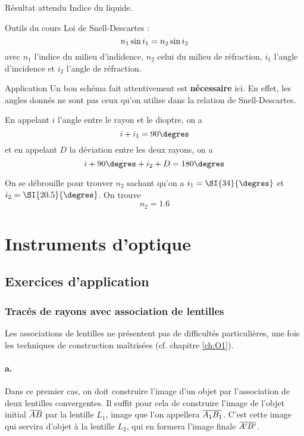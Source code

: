 \documentclass[10pt,a5paper,notitlepage]{book}
\begin{document}
\begin{rtcb}{Résultat attendu}
    Indice du liquide.
\end{rtcb}

\begin{btcb}{Outils du cours}
    Loi de Snell-Descartes :
    \[ n_1\ss i_1 = n_2 \ss i_2 \]
    avec $n_1$ l'indice du milieu d'indidence, $n_2$ celui du milieu de
    réfraction, $i_1$ l'angle d'incidence et $i_2$ l'angle de réfraction.
\end{btcb}

\begin{lgtcb}{Application}
    Un bon schéma fait attentivement est \textbf{nécessaire} ici. En effet,
    les angles donnés ne sont pas ceux qu'on utilise dans la relation de
    Snell-Descartes. \bigbreak
    
    En appelant $i$ l'angle entre le rayon et le dioptre, on a
    \[ i + i_1 = 90\degres\]
    et en appelant $D$ la déviation entre les deux rayons, on a
    \[ i + 90\degres + i_2 + D = 180\degres\]

    On se débrouille pour trouver $n_2$ sachant qu'on a $i_1 = \SI{34}{\degres}$
    et $i_2 = \SI{20.5}{\degres}$. On trouve
    \[ \boxed{n_2 = 1.6} \]
\end{lgtcb}

\chapter{Instruments d'optique}
\vspace*{-24pt}
\section{Exercices d'application}
\subsection{Tracés de rayons avec association de lentilles}
Les associations de lentilles ne présentent pas de difficultés particulières,
une fois les techniques de construction maîtrisées (cf. chapitre \ref{ch:O1}).

\subsubsection{a.}
Dans ce premier cas, on doit construire l'image d'un objet  par
l'association de deux lentilles convergentes. Il suffit pour cela de construire
l'image de l'objet initial $\ABb$ par la lentille $L_1$, image que l'on appellera
$\ABa$. C'est cette image qui servira d'objet à la lentille $L_2$, qui en
formera l'image finale $\ABp$. \bigbreak
\end{document}
